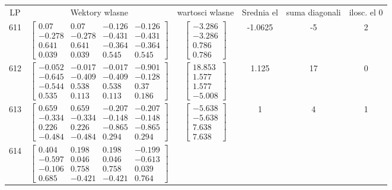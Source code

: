 \documentclass[a4paper,12pt]{article}
\begin{document}
\bgroup {} \vspace{0.2in} \begin{tabular}{c c c c c c}
LP &Wektory wlasne & wartosci wlasne & Srednia el & suma diagonali & ilosc. el 0\\
611
&
$\begin{bmatrix} 0.07 & 0.07 & -0.126 & -0.126 \\ -0.278 & -0.278 & -0.431 & -0.431 \\ 0.641 & 0.641 & -0.364 & -0.364 \\ 0.039 & 0.039 & 0.545 & 0.545 \end{bmatrix}$
&
$\begin{bmatrix} -3.286 \\ -3.286 \\ 0.786 \\ 0.786 \end{bmatrix}$
&
-1.0625
&
-5
&
2
\\
612
&
$\begin{bmatrix} -0.052 & -0.017 & -0.017 & -0.901 \\ -0.645 & -0.409 & -0.409 & -0.128 \\ -0.544 & 0.538 & 0.538 & 0.37 \\ 0.535 & 0.113 & 0.113 & 0.186 \end{bmatrix}$
&
$\begin{bmatrix} 18.853 \\ 1.577 \\ 1.577 \\ -5.008 \end{bmatrix}$
&
1.125
&
17
&
0
\\
613
&
$\begin{bmatrix} 0.659 & 0.659 & -0.207 & -0.207 \\ -0.334 & -0.334 & -0.148 & -0.148 \\ 0.226 & 0.226 & -0.865 & -0.865 \\ -0.484 & -0.484 & 0.294 & 0.294 \end{bmatrix}$
&
$\begin{bmatrix} -5.638 \\ -5.638 \\ 7.638 \\ 7.638 \end{bmatrix}$
&
1
&
4
&
1
\\
614
&
$\begin{bmatrix} 0.404 & 0.198 & 0.198 & -0.199 \\ -0.597 & 0.046 & 0.046 & -0.613 \\ -0.106 & 0.758 & 0.758 & 0.039 \\ 0.685 & -0.421 & -0.421 & 0.764 \end{bmatrix}$

\end{tabular}
\end{document}
